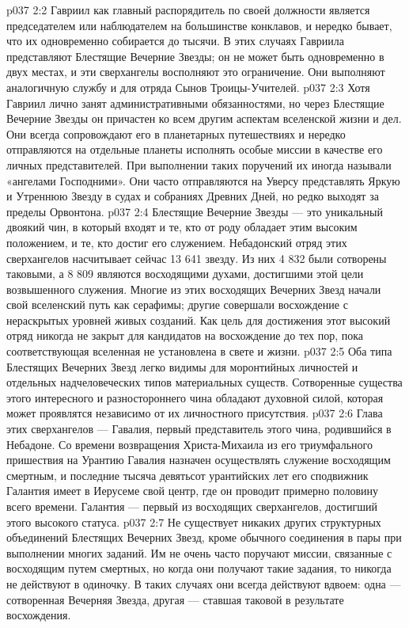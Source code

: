 \vs p037 2:2 Гавриил как главный распорядитель по своей должности является председателем или наблюдателем на большинстве конклавов, и нередко бывает, что их одновременно собирается до тысячи. В этих случаях Гавриила представляют Блестящие Вечерние Звезды; он не может быть одновременно в двух местах, и эти сверхангелы восполняют это ограничение. Они выполняют аналогичную службу и для отряда Сынов Троицы\hyp{}Учителей.
\vs p037 2:3 Хотя Гавриил лично занят административными обязанностями, но через Блестящие Вечерние Звезды он причастен ко всем другим аспектам вселенской жизни и дел. Они всегда сопровождают его в планетарных путешествиях и нередко отправляются на отдельные планеты исполнять особые миссии в качестве его личных представителей. При выполнении таких поручений их иногда называли «ангелами Господними». Они часто отправляются на Уверсу представлять Яркую и Утреннюю Звезду в судах и собраниях Древних Дней, но редко выходят за пределы Орвонтона.
\vs p037 2:4 \pc Блестящие Вечерние Звезды --- это уникальный двоякий чин, в который входят и те, кто от роду обладает этим высоким положением, и те, кто достиг его служением. Небадонский отряд этих сверхангелов насчитывает сейчас 13 641 звезду. Из них 4 832 были сотворены таковыми, а 8 809 являются восходящими духами, достигшими этой цели возвышенного служения. Многие из этих восходящих Вечерних Звезд начали свой вселенский путь как серафимы; другие совершали восхождение с нераскрытых уровней живых созданий. Как цель для достижения этот высокий отряд никогда не закрыт для кандидатов на восхождение до тех пор, пока соответствующая вселенная не установлена в свете и жизни.
\vs p037 2:5 Оба типа Блестящих Вечерних Звезд легко видимы для моронтийных личностей и отдельных надчеловеческих типов материальных существ. Сотворенные существа этого интересного и разностороннего чина обладают духовной силой, которая может проявлятся независимо от их личностного присутствия.
\vs p037 2:6 \pc Глава этих сверхангелов --- Гавалия, первый представитель этого чина, родившийся в Небадоне. Со времени возвращения Христа\hyp{}Михаила из его триумфального пришествия на Урантию Гавалия назначен осуществлять служение восходящим смертным, и последние тысяча девятьсот урантийских лет его сподвижник Галантия имеет в Иерусеме свой центр, где он проводит примерно половину всего времени. Галантия --- первый из восходящих сверхангелов, достигший этого высокого статуса.
\vs p037 2:7 Не существует никаких других структурных объединений Блестящих Вечерних Звезд, кроме обычного соединения в пары при выполнении многих заданий. Им не очень часто поручают миссии, связанные с восходящим путем смертных, но когда они получают такие задания, то никогда не действуют в одиночку. В таких случаях они всегда действуют вдвоем: одна --- сотворенная Вечерняя Звезда, другая --- ставшая таковой в результате восхождения.
